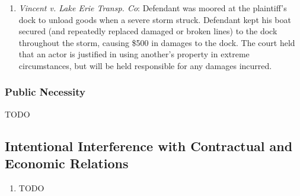 \begin{enumerate}
    \item \emph{Vincent v. Lake Erie Transp. Co}: Defendant was moored at the plaintiff's dock to unload goods when a severe storm struck. Defendant kept his boat secured (and repeatedly replaced damaged or broken lines) to the dock throughout the storm, causing \$500 in damages to the dock. The court held that an actor is justified in using another's property in extreme circumstances, but will be held responsible for any damages incurred.
\end{enumerate}

\subsubsection{Public Necessity}

TODO

\subsection{Intentional Interference with Contractual and Economic Relations}

\begin{enumerate}
    \item TODO
\end{enumerate}
